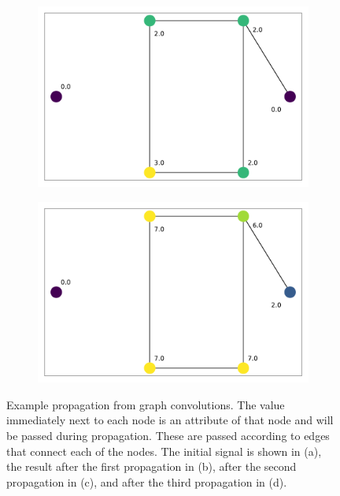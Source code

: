 \documentclass[thesis.tex]{subfiles}
\begin{document}
\begin{figure}[t]
\begin{subfigure}{0.45\textwidth}
		\caption{}
		\label{fig:prop-ex-1}
	\end{subfigure}
	\begin{subfigure}{0.45\textwidth}
		\includegraphics[width=\textwidth]{figures/graph_signal-02.pdf}
		\caption{}
		\label{fig:prop-ex-2}
	\end{subfigure}
	\begin{subfigure}{0.45\textwidth}
		\includegraphics[width=\textwidth]{figures/graph_signal-03.pdf}
		\caption{}
		\label{fig:prop-ex-3}
	\end{subfigure}
	\caption{
	Example propagation from graph convolutions.
	The value immediately next to each node is an attribute of that node and will be passed during propagation.
	These are passed according to edges that connect each of the nodes.
	The initial signal is shown in (a), the result after the first propagation in (b), after the second propagation in (c), and after the third propagation in (d).
	}
	\label{fig:prop-ex}
\end{figure}
\end{document}
